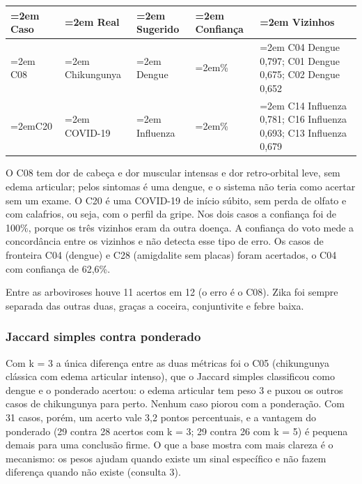 \documentclass[12pt, a4paper]{article}
\begin{document}
\begingroup
\setlength{\tabcolsep}{3.0pt}
\begin{longtable}{@{}>{\small \raggedright\hyphenpenalty=30\tolerance=999\emergencystretch=2em\arraybackslash}p{1.69cm}>{\small \raggedright\hyphenpenalty=30\tolerance=999\emergencystretch=2em\arraybackslash}p{2.40cm}>{\small \raggedright\hyphenpenalty=30\tolerance=999\emergencystretch=2em\arraybackslash}p{2.24cm}>{\small \raggedright\hyphenpenalty=30\tolerance=999\emergencystretch=2em\arraybackslash}p{2.24cm}>{\small \raggedright\hyphenpenalty=30\tolerance=999\emergencystretch=2em\arraybackslash}p{5.87cm}@{}}
\toprule\noalign{}
Caso & Real & Sugerido & Confiança & Vizinhos \\
\midrule\noalign{}
\endhead
\bottomrule\noalign{}
\endlastfoot
C08 & Chikungunya & Dengue & 100\% & C04 Dengue 0,797; C01 Dengue 0,675; C02 Dengue 0,652 \\
C20 & COVID-19 & Influenza & 100\% & C14 Influenza 0,781; C16 Influenza 0,693; C13 Influenza 0,679 \\
\end{longtable}
\endgroup

O C08 tem dor de cabeça e dor muscular intensas e dor retro-orbital leve, sem edema articular; pelos sintomas é uma dengue, e o sistema não teria como acertar sem um exame. O C20 é uma COVID-19 de início súbito, sem perda de olfato e com calafrios, ou seja, com o perfil da gripe. Nos dois casos a confiança foi de 100\%, porque os três vizinhos eram da outra doença. A confiança do voto mede a concordância entre os vizinhos e não detecta esse tipo de erro. Os casos de fronteira C04 (dengue) e C28 (amigdalite sem placas) foram acertados, o C04 com confiança de 62,6\%.

Entre as arboviroses houve 11 acertos em 12 (o erro é o C08). Zika foi sempre separada das outras duas, graças a coceira, conjuntivite e febre baixa.

\subsubsection{Jaccard simples contra ponderado}\label{jaccard-simples-contra-ponderado}

Com k = 3 a única diferença entre as duas métricas foi o C05 (chikungunya clássica com edema articular intenso), que o Jaccard simples classificou como dengue e o ponderado acertou: o edema articular tem peso 3 e puxou os outros casos de chikungunya para perto. Nenhum caso piorou com a ponderação. Com 31 casos, porém, um acerto vale 3,2 pontos percentuais, e a vantagem do ponderado (29 contra 28 acertos com k = 3; 29 contra 26 com k = 5) é pequena demais para uma conclusão firme. O que a base mostra com mais clareza é o mecanismo: os pesos ajudam quando existe um sinal específico e não fazem diferença quando não existe (consulta 3).
\end{document}

